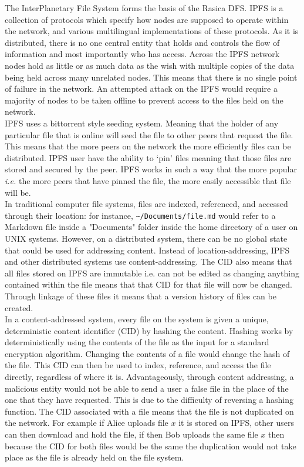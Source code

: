 The InterPlanetary File System forms the basis of the Rasica DFS. IPFS is a collection of protocols which specify how nodes are supposed to operate within the network, and various multilingual implementations of these protocols. As it is distributed, there is no one central entity that holds and controls the flow of information and most importantly who has access. Across the IPFS network nodes hold as little or as much data as the wish with multiple copies of the data being held across many unrelated nodes. This means that there is no single point of failure in the network. An attempted attack on the IPFS would require a majority of nodes to be taken offline to prevent access to the files held on the network.   \\

IPFS uses a bittorrent style seeding system. Meaning that the holder of any particular file that is online will seed the file to other peers that request the file. This means that the more peers on the network the more efficiently files can be distributed. IPFS user have the ability to `pin' files meaning that those files are stored and secured by the peer. IPFS works in such a way that the more popular \textit{i.e.} the more peers that have pinned the file, the more easily accessible that file will be.   \\

In traditional computer file systems, files are indexed, referenced, and accessed through their location: for instance, \verb`~/Documents/file.md` would refer to a Markdown file inside a "Documents" folder inside the home directory of a user on UNIX systems. However, on a distributed system, there can be no global state that could be used for addressing content. Instead of location-addressing, IPFS and other distributed systems use content-addressing. The CID also means that all files stored on IPFS are immutable i.e. can not be edited as changing anything contained within the file means that that CID for that file will now be changed. Through linkage of these files it means that a version history of files can be created. \\

In a content-addressed system, every file on the system is given a unique, deterministic content identifier (CID) by hashing the content. Hashing works by deterministically using the contents of the file as the input for a standard encryption algorithm. Changing the contents of a file would change the hash of the file. This CID can then be used to index, reference, and access the file directly, regardless of where it is. Advantageously, through content addressing, a malicious entity would not be able to send a user a false file in the place of the one that they have requested. This is due to the difficulty of reversing a hashing function. The CID associated with a file means that the file is not duplicated on the network. For example if Alice uploads file $x$ it is stored on IPFS, other users can then download and hold the file, if then Bob uploads the same file $x$ then because the CID for both files would be the same the duplication would not take place as the file is already held on the file system.  \\

